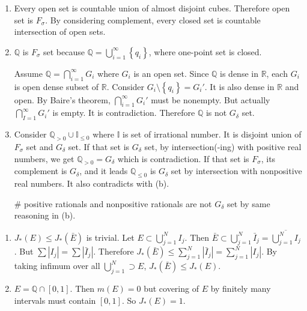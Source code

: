 \begin{problem}[1.13] \hfill
	\begin{enumerate}[label = (\alph*)]
		\item Every open set is countable union of almost disjoint cubes. Therefore open set is $F_\sigma$. By considering complement, every closed set is countable intersection of open sets.

		\item $\mathbb{Q}$ is $F_\sigma$ set because $\mathbb{Q} = \bigcup_{i=1}^\infty \left\{ q_i \right\} $, where one-point set is closed.

			Assume $\mathbb{Q} = \bigcap_{i=1}^\infty G_i$ where $G_i$ is an open set. Since $\mathbb{Q}$ is dense in $\mathbb{R}$, each $G_i$ is open dense subset of $\mathbb{R}$. Consider $G_i \setminus \left\{ q_i \right\} = G_i'$. It is also dense in $\mathbb{R}$ and open. By Baire's theorem, $\bigcap_{i=1}^\infty G_i'$ must be nonempty. But actually $\bigcap_{I=1}^\infty G_i'$ is empty. It is contradiction. Therefore $\mathbb{Q}$ is not $G_\delta$ set.

		\item Consider $\mathbb{Q}_{>0} \cup \mathbb{I}_{\leq 0}$ where $\mathbb{I}$ is set of irrational number. It is disjoint union of $F_\sigma$ set and $G_\delta$ set. If that set is $G_\delta$ set, by intersection(-ing) with positive real numbers, we get $\mathbb{Q}_{>0} = G_\delta$ which is contradiction. If that set is $F_\sigma$, its complement is $G_\delta$, and it leads $\mathbb{Q}_{\leq 0}$ is $G_\delta$ set by intersection with nonpositive real numbers. It also contradicts with (b).

		\#	positive rationals and nonpositive rationals are not $G_\delta$ set by same reasoning in (b).
	\end{enumerate}
	
\end{problem}

\begin{problem}[1.14] \hfill
	\begin{enumerate}[label = (\alph*)]
		\item $J_{*}(E) \leq J_{*}(\bar{E})$ is trivial.
			Let $E \subset \bigcup_{j=1}^N I_j$. Then $\bar{E} \subset \bigcup_{j=1}^N \bar{I}_j = \overline{\bigcup_{j=1}^N I_j}$. But $\sum |I_j| =  \sum |\bar{I}_j|$. Therefore $J_{*}(\bar{E}) \leq \sum_{j=1}^N|\bar{I}_j| = \sum_{j=1}^N |I_j|$. By taking infimum over all $\bigcup_{j=1}^N \supset E$, $J_{*}\left( \bar{E} \right) \leq J_{*}(E)$.

		\item $E = \mathbb{Q} \cap \left[ 0, 1 \right]$. Then $m(E) = 0$ but covering of $E$ by finitely many intervals must contain $\left[ 0, 1 \right]$. So $J_{*}(E) = 1$.
	\end{enumerate}
	
\end{problem}

